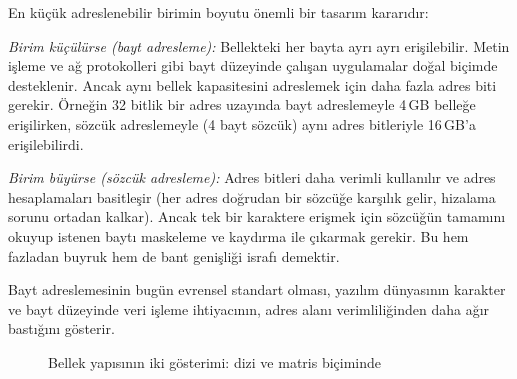 \begin{karsilastirma}
En küçük adreslenebilir birimin boyutu önemli bir tasarım kararıdır:

\textit{Birim küçülürse (bayt adresleme):} Bellekteki her bayta ayrı ayrı erişilebilir. Metin işleme ve ağ protokolleri gibi bayt düzeyinde çalışan uygulamalar doğal biçimde desteklenir. Ancak aynı bellek kapasitesini adreslemek için daha fazla adres biti gerekir. Örneğin 32 bitlik bir adres uzayında bayt adreslemeyle 4\,GB belleğe erişilirken, sözcük adreslemeyle (4 bayt sözcük) aynı adres bitleriyle 16\,GB'a erişilebilirdi.

\textit{Birim büyürse (sözcük adresleme):} Adres bitleri daha verimli kullanılır ve adres hesaplamaları basitleşir (her adres doğrudan bir sözcüğe karşılık gelir, hizalama sorunu ortadan kalkar). Ancak tek bir karaktere erişmek için sözcüğün tamamını okuyup istenen baytı maskeleme ve kaydırma ile çıkarmak gerekir. Bu hem fazladan buyruk hem de bant genişliği israfı demektir.

Bayt adreslemesinin bugün evrensel standart olması, yazılım dünyasının karakter ve bayt düzeyinde veri işleme ihtiyacının, adres alanı verimliliğinden daha ağır bastığını gösterir.
\end{karsilastirma}

\begin{figure}[H]
\centering
{}
\caption[Bellek yapısının iki gösterimi]{Bellek yapısının iki gösterimi: dizi ve matris biçiminde}
\label{fig:bellek-yapisi}
\end{figure}

